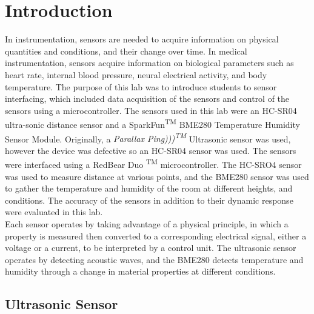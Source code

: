 \documentclass[11pt]{article}
\begin{document}
\thispagestyle{empty}
\tableofcontents
\listoffigures
\newpage


\section{Introduction}

In instrumentation, sensors are needed to acquire information on physical quantities and conditions, and their change over time. In medical instrumentation, sensors acquire information on biological parameters such as heart rate, internal blood pressure, neural electrical activity, and body temperature. The purpose of this lab was to introduce students to sensor
 interfacing, which included data acquisition of the sensors and control of the sensors using a microcontroller. The sensors used in this lab were an HC-SR04 ultra-sonic distance sensor and a SparkFun\textsuperscript{TM} BME280 Temperature Humidity Sensor Module. Originally, a \textit{Parallax Ping)))\textsuperscript{TM}}  Ultrasonic sensor was used, however the device was defective so an HC-SR04 sensor was used. The sensors were interfaced using a RedBear Duo \textsuperscript{TM} microcontroller. The HC-SRO4 sensor was used to measure distance at various points, and the BME280 sensor was used to gather the temperature and humidity of the room at different heights, and conditions. The accuracy of the sensors in addition to their dynamic response were evaluated in this lab. \\

Each sensor operates by taking advantage of a physical principle, in which a property is measured then converted to a corresponding electrical signal, either a voltage or a current, to be interpreted by a control unit. The ultrasonic sensor operates by detecting acoustic waves, and the BME280 detects temperature and humidity through a change in material properties at different conditions. \\

\subsection{Ultrasonic Sensor}
\end{document}
